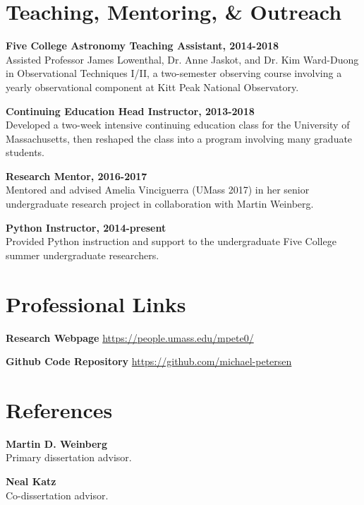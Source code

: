 \documentclass[margin, 12pt]{res} %
\begin{document}
\begin{resume}



\section{\sc Teaching, Mentoring, \& Outreach}

{\bf Five College Astronomy Teaching Assistant, 2014-2018}\\
Assisted Professor James Lowenthal, Dr. Anne Jaskot, and Dr. Kim Ward-Duong in Observational Techniques I/II, a two-semester observing course involving a yearly observational component at Kitt Peak National Observatory.

{\bf Continuing Education Head Instructor, 2013-2018}\\
Developed a two-week intensive continuing education class for the University of Massachusetts, then reshaped the class into a program involving many graduate students.

{\bf Research Mentor, 2016-2017}\\
Mentored and advised Amelia Vinciguerra (UMass 2017) in her senior undergraduate research project in collaboration with Martin Weinberg.


{\bf Python Instructor, 2014-present}\\
Provided Python instruction and support to the undergraduate Five College summer undergraduate researchers.

\section{\sc Professional Links}
{\bf Research Webpage} \url{https://people.umass.edu/mpete0/}

{\bf Github Code Repository} \url{https://github.com/michael-petersen}


\section{\sc References}
{\bf Martin D. Weinberg}\\
Primary dissertation advisor.

{\bf Neal Katz}\\
Co-dissertation advisor.



\end{resume}
\end{document}
